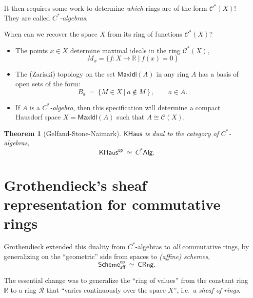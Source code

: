 \documentclass[11pt]{article}
\newtheorem{theorem}{Theorem}
\theoremstyle{remark}
\theoremstyle{definition}
\begin{document}
 It then requires some work to  determine \emph{which} rings are of the form $\mathcal{C}^*(X)$!  
 They are called \emph{$C^*$-algebras}.

When can we recover the space $X$ from its ring of functions $\mathcal{C}^*(X)$?

\begin{itemize}
\item The points  $x\in X$ determine maximal ideals in the ring $\mathcal{C}^*(X)$,
\[
M_x = \{ f : X\to \mathbb{R}\ |\ f(x) = 0\ \}
\]
\item The (Zariski) topology on the set $\mathsf{MaxIdl}(A)$ in any ring $A$ has a basis of open sets of the form:
\[
B_a\ =\ \{M \in X\ |\ a\notin M\ \}\, ,\qquad a\in A.
\]
\item If $A$ is a \emph{$C^*$-algebra}, then this specification will determine a compact Hausdorf space $X = \mathsf{MaxIdl}(A)$ such that $A\cong \mathcal{C}(X)$.
\end{itemize}

 \begin{theorem}[Gelfand-Stone-Naimark]
 $\mathsf{KHaus}$ is dual to the category of $C^*$-algebras,
 \[
\mathsf{KHaus}^\mathsf{op}\ \simeq\ C^*\mathsf{Alg}.
 \]
 \end{theorem}

\section{Grothendieck's sheaf representation for commutative rings}

Grothendieck extended this duality from $C^*$-algebras to \emph{all} commutative rings, by generalizing on the ``geometric'' side from spaces to \emph{(affine) schemes},
 \[
\mathsf{Scheme}_\mathsf{aff}^\mathsf{op}\ \simeq\ \mathsf{CRng}.
 \]

The essential change was to generalize the ``ring of values'' from the constant ring $\mathbb{R}$ to a ring $\mathcal{R}$ that ``varies continuously over the space $X$'', i.e.\ a \emph{sheaf of rings}.   
\medskip
\end{document}
